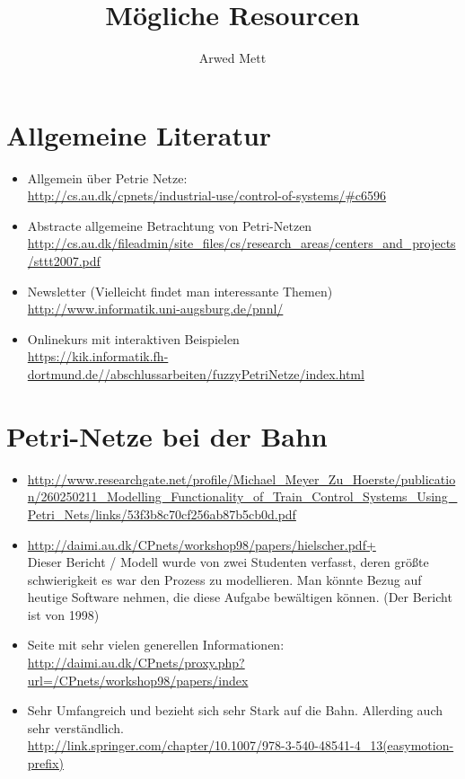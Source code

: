 \documentclass{article}
\author{Arwed Mett}
\title{Mögliche Resourcen}
\begin{document}
\maketitle

\section{Allgemeine Literatur}
\begin{itemize}
    \item Allgemein über Petrie Netze:\\
        \url{http://cs.au.dk/cpnets/industrial-use/control-of-systems/#c6596}
    \item Abstracte allgemeine Betrachtung von Petri-Netzen\\
        \url{http://cs.au.dk/fileadmin/site_files/cs/research_areas/centers_and_projects/sttt2007.pdf}
    \item Newsletter (Vielleicht findet man interessante Themen)
        \url{http://www.informatik.uni-augsburg.de/pnnl/}
    \item Onlinekurs mit interaktiven Beispielen \\
        \url{https://kik.informatik.fh-dortmund.de//abschlussarbeiten/fuzzyPetriNetze/index.html}
\end{itemize}

\section{Petri-Netze bei der Bahn}
\begin{itemize}
    \item \url{http://www.researchgate.net/profile/Michael_Meyer_Zu_Hoerste/publication/260250211_Modelling_Functionality_of_Train_Control_Systems_Using_Petri_Nets/links/53f3b8c70cf256ab87b5cb0d.pdf}
    \item \url{http://daimi.au.dk/CPnets/workshop98/papers/hielscher.pdf+}\\
        Dieser Bericht / Modell wurde von zwei Studenten verfasst, deren größte schwierigkeit es war den Prozess zu modellieren.
        Man könnte Bezug auf heutige Software nehmen, die diese Aufgabe bewältigen können. (Der Bericht ist von 1998)

    \item Seite mit sehr vielen generellen Informationen:\\
        \url{http://daimi.au.dk/CPnets/proxy.php?url=/CPnets/workshop98/papers/index}
    \item Sehr Umfangreich und bezieht sich sehr Stark auf die Bahn. Allerding auch sehr verständlich.\\
        \url{http://link.springer.com/chapter/10.1007/978-3-540-48541-4_13(easymotion-prefix)}
\end{itemize}
\end{document}
